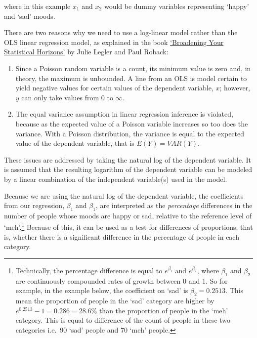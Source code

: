 \documentclass[
  12pt,
]{krantz}
\begin{document}
where in this example \(x_1\) and \(x_2\) would be dummy variables representing `happy' and `sad' moods.

There are two reasons why we need to use a log-linear model rather than the OLS linear regression model, as explained in the book \href{https://bookdown.org/roback/bookdown-bysh/}{`Broadening Your Statistical Horizons'} by Julie Legler and Paul Roback:

\begin{enumerate}
\def\labelenumi{\arabic{enumi}.}
\item
  Since a Poisson random variable is a count, its minimum value is zero and, in theory, the maximum is unbounded. A line from an OLS is model certain to yield negative values for certain values of the dependent variable, \(x\); however, \(y\) can only take values from 0 to \(\infty\).
\item
  The equal variance assumption in linear regression inference is violated, because as the expected value of a Poisson variable increases so too does the variance. With a Poisson distribution, the variance is equal to the expected value of the dependent variable, that is \(E(Y) = VAR(Y)\).
\end{enumerate}

These issues are addressed by taking the natural log of the dependent variable. It is assumed that the resulting logarithm of the dependent variable can be modeled by a linear combination of the independent variable(s) used in the model.

Because we are using the natural log of the dependent variable, the coefficients from our regression, \(\beta_1\) and \(\beta_1\), are interpreted as the \emph{percentage} differences in the number of people whose moods are happy or sad, relative to the reference level of `meh'.\footnote{Technically, the percentage difference is equal to \(e^{\beta_1}\) and \(e^{\beta_2}\), where \(\beta_1\) and \(\beta_2\) are continuously compounded rates of growth between 0 and 1. So for example, in the example below, the coefficient on `sad' is \(\beta_2 = 0.2513\). This mean the proportion of people in the `sad' category are higher by \(e^{0.2513} - 1 = 0.286 = 28.6\%\) than the proportion of people in the `meh' category. This is equal to difference of the count of people in these two categories i.e.~90 `sad' people and 70 `meh' people.} Because of this, it can be used as a test for differences of proportions; that is, whether there is a significant difference in the percentage of people in each category.
\end{document}
